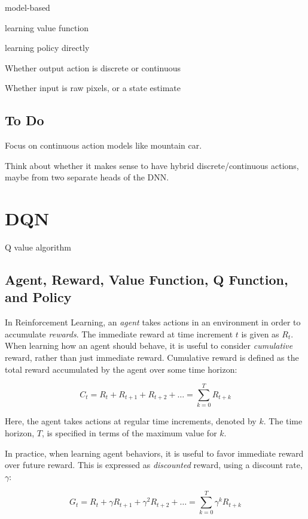 \documentclass[acmlarge,screen]{acmart}
\begin{document}
model-based

learning value function

learning policy directly

Whether output action is discrete or continuous

Whether input is raw pixels, or a state estimate

\subsection{To Do}

Focus on continuous action models like mountain car.

Think about whether it makes sense to have hybrid discrete/continuous actions, maybe
from two separate heads of the DNN.



\section{DQN}

Q value algorithm


\subsection{Agent, Reward, Value Function, Q Function, and Policy}

In Reinforcement Learning, an \textit{agent} takes actions in an environment in order to accumulate \textit{rewards}.
The immediate reward at time increment $t$ is given as $R_t$.
When learning how an agent should behave, it is useful to consider \textit{cumulative} reward, 
rather than just immediate reward.
Cumulative reward is defined as the total reward accumulated by the agent over some time horizon:

\begin{equation}
  C_t = R_t + R_{t+1} + R_{t+2} + \ldots = \sum_{k=0}^T R_{t+k} 
\end{equation}

Here, the agent takes actions at regular time increments, denoted by $k$.  
The time horizon, $T$, is specified in terms of the maximum value for $k$.

In practice, when learning agent behaviors, it is useful to favor immediate reward over future reward. 
This is expressed as \textit{discounted} reward, using a discount rate, $\gamma$:
  
\begin{equation}
  G_t = R_t + \gamma R_{t+1} + \gamma^2 R_{t+2} + \ldots = \sum_{k=0}^T \gamma^k R_{t+k} 
\end{equation}
\end{document}
